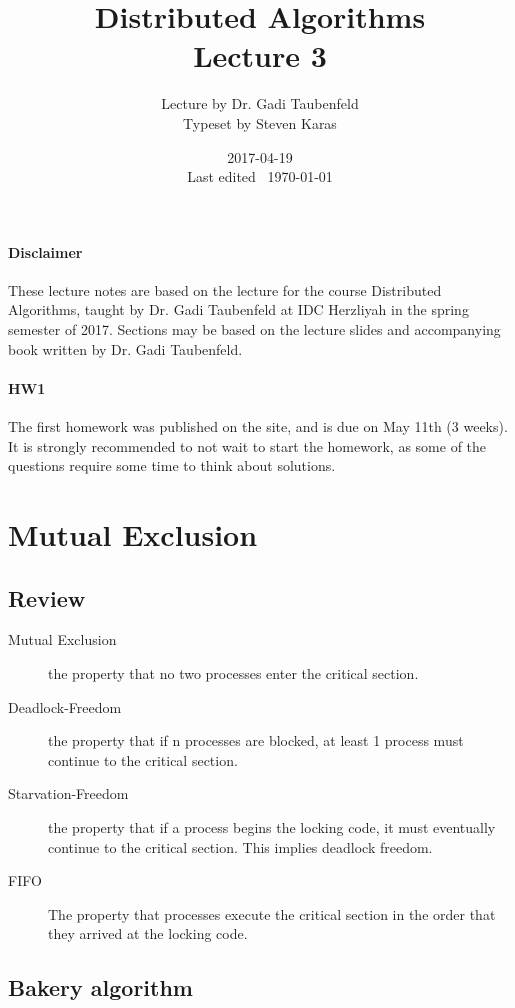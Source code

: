 \documentclass{idc_msc}
\title{Distributed Algorithms\\\large Lecture 3}
\date{2017-04-19 \\ Last edited \currenttime\ \today}
\author{Lecture by Dr. Gadi Taubenfeld\\Typeset by Steven Karas}
\begin{document}
\maketitle

\paragraph{Disclaimer}

These lecture notes are based on the lecture for the course Distributed Algorithms, taught by Dr. Gadi Taubenfeld at IDC Herzliyah in the spring semester of 2017.
Sections may be based on the lecture slides and accompanying book written by Dr. Gadi Taubenfeld.

\paragraph{HW1}
The first homework was published on the site, and is due on May 11th (3 weeks).
It is strongly recommended to not wait to start the homework, as some of the questions require some time to think about solutions.

\section{Mutual Exclusion}

\subsection{Review}

\begin{description}
  \item[Mutual Exclusion] the property that no two processes enter the critical section.
  \item[Deadlock-Freedom] the property that if n processes are blocked, at least 1 process must continue to the critical section.
  \item[Starvation-Freedom] the property that if a process begins the locking code, it must eventually continue to the critical section. This implies deadlock freedom.
  \item[FIFO] The property that processes execute the critical section in the order that they arrived at the locking code.
\end{description}

\subsection{Bakery algorithm}
\end{document}
